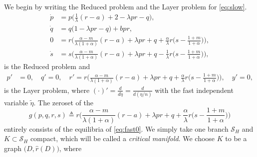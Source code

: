 \documentclass[a4paper,11pt]{article}
\theoremstyle{remark}
\begin{document}
We begin by writing the Reduced problem and the Layer problem for \eqref{eq:slow}. 
\begin{equation}\label{eq:slow0} \tag{R}
 \begin{aligned}
 \dot{p} &=p\Big(\frac{1}{\lambda}({r}-a) + 2- \lambda p {r} -q\Big),\\%
 \dot{q} &=q\Big(1 -\lambda p {r} -q\Big) + b p {r},\\%
 0&=r\Big(\frac{\alpha-m}{\lambda(1+\alpha)}(r-a) + \lambda pr + q +\frac{\alpha}{\lambda}r\big(s- \frac{1+m}{1+\alpha}\big)\Big),\\
 \dot{s} &=s\Big(\frac{\alpha-m}{\lambda(1+\alpha)}({r}-a) + \lambda p{r} + q - \frac{1}{\lambda}{r}\big(s- \frac{1+m}{1+\alpha}\big)\Big),%
 \end{aligned}
\end{equation}
is the Reduced problem and
\begin{equation} \label{eq:fast0} 
 \begin{aligned}
 {p}' &=0, \quad {q}' =0, \quad {r}' =r\Big(\frac{\alpha-m}{\lambda(1+\alpha)}(r-a) + \lambda pr + q +\frac{\alpha}{\lambda}r\big(s- \frac{1+m}{1+\alpha}\big)\Big), \quad{y}' =0,
 \end{aligned}
\end{equation}
is the Layer problem, where $(\cdot)'= \frac{d}{d\tilde{\eta}} = \frac{d}{d(\eta/n)}$ with the fast independent variable $\tilde{\eta}$. The zeroset of the %
$$g(p,q,r,s)\triangleq r\Big(\frac{\alpha-m}{\lambda(1+\alpha)}(r-a) + \lambda pr + q +\frac{\alpha}{\lambda}r\big(s- \frac{1+m}{1+\alpha}\big)\Big)$$
entirely consists of the equilibria of \eqref{eq:fast0}. We simply take one branch $\mathcal{S}_H$ and $K\subset\mathcal{S}_H$ compact, which will be called a {\it critical manifold}. We choose $K$ to be a graph $\big(D,\hat{r}(D)\big)$, where
\end{document}
